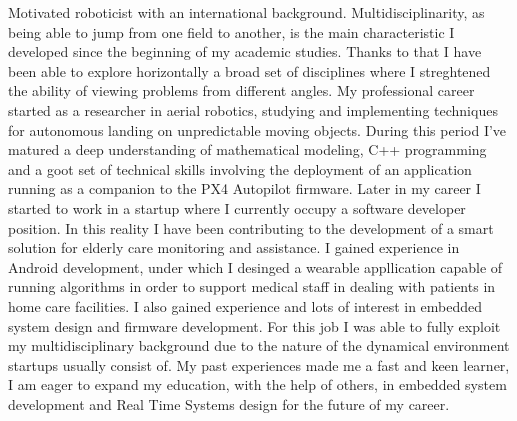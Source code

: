 

\begin{cvparagraph}
    Motivated roboticist with an international background. Multidisciplinarity, as being able to jump from one field to another, is the main characteristic I developed since the beginning of my academic studies.
    Thanks to that I have been able to explore horizontally a broad set of disciplines where I streghtened the ability of viewing problems from different angles. My professional career started as a researcher in aerial robotics, studying and implementing techniques for autonomous landing on unpredictable moving objects. 
    During this period I've matured a deep understanding of mathematical modeling, C++ programming and a goot set of technical skills involving the deployment of an application running as a companion to the PX4 Autopilot firmware. 
    Later in my career I started to work in a startup where I currently occupy a software developer position. In this reality I have been contributing to the development of a smart solution for elderly care monitoring and assistance. I gained experience in Android development, under which I desinged a wearable appllication capable of running algorithms in order to support 
    medical staff in dealing with patients in home care facilities. I also gained experience and lots of interest in embedded system design and firmware development. For this job I was able to fully exploit my multidisciplinary background due to the nature of the dynamical environment startups usually consist of.
    My past experiences made me a fast and keen learner, I am eager to expand my education, with the help of others, in embedded system development and Real Time Systems design for the future of my career.
\end{cvparagraph}
